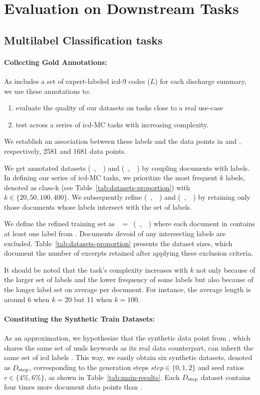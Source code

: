 \section{Evaluation on Downstream Tasks}

\subsection{Multilabel Classification tasks}
\label{subsec:multitask}
\paragraph{Collecting Gold Annotations:}
As \mimic includes a set of expert-labeled \gls{icd}-9 codes ($L$) for each discharge summary, we use these annotations to:
\begin{enumerate}
\item evaluate the quality of our datasets on tasks close to a real use-case
\item test across a series of \gls{icd}-MC tasks with increasing complexity.
\end{enumerate}
We establish an association between these labels and the data points in \dtr and \dte, respectively, \num{2581} and \num{1681} data points.

We get annotated datasets (~\dtr,~\ltr~) and (~\dte,~\lte~) by coupling documents with labels. In defining our series of \gls{icd}-MC tasks, we prioritize the most frequent $k$ labels, denoted as class-k (see Table~\ref{tab:datasets-proportion}) with $k \in \{20,50,100,400\}$. We subsequently refine  (~\dtr,~\ltr~) and (~\dte,~\lte~) by retaining only those documents whose labels intersect with the set of  labels.

We define the refined training set as \dgold~$=$~(~\dptr,~\lptr~) where each document in \dptr contains at least one label from . Documents devoid of any intersecting labels are excluded. Table~\ref{tab:datasets-proportion} presents the dataset sizes, which document the number of excerpts retained after applying these exclusion criteria.

It should be noted that the task's complexity increases with $k$ not only because of the larger set of labels and the lower frequency of some labels but also because of the longer label set on average per document. For instance, the average length is around 6 when $k=20$ but 11 when $k=100$.

\paragraph{Constituting the Synthetic Train Datasets: }
As an approximation, we hypothesize that the synthetic data point from \dgstar, which shares the same set of \gls{umls} keywords as its real data counterpart, can inherit the same set of \gls{icd} labels \lptr. This way, we easily obtain six synthetic datasets, denoted as $D_{\mathrm{step}}$, corresponding to the generation steps $step \in \{0,1,2\}$ and seed ratios $r \in \{4\%,6\%\}$, as shown in Table~\ref{tab:main-results}. Each $D_{\mathrm{step}}$ dataset contains four times more document data points than \dgold.

